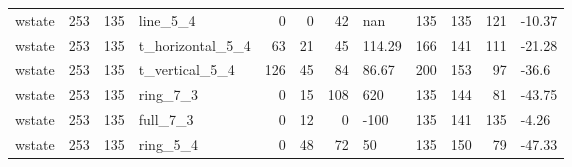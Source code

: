 \begin{longtable}{lrrlrrrlrrrl}
wstate & 253 & 135 & line\_5\_4 & 0 & 0 & 42 & nan & 135 & 135 & 121 & -10.37 \\
wstate & 253 & 135 & t\_horizontal\_5\_4 & 63 & 21 & 45 & 114.29 & 166 & 141 & 111 & -21.28 \\
wstate & 253 & 135 & t\_vertical\_5\_4 & 126 & 45 & 84 & 86.67 & 200 & 153 & 97 & -36.6 \\
wstate & 253 & 135 & ring\_7\_3 & 0 & 15 & 108 & 620 & 135 & 144 & 81 & -43.75 \\
wstate & 253 & 135 & full\_7\_3 & 0 & 12 & 0 & -100 & 135 & 141 & 135 & -4.26 \\
wstate & 253 & 135 & ring\_5\_4 & 0 & 48 & 72 & 50 & 135 & 150 & 79 & -47.33 \\
\end{longtable}
